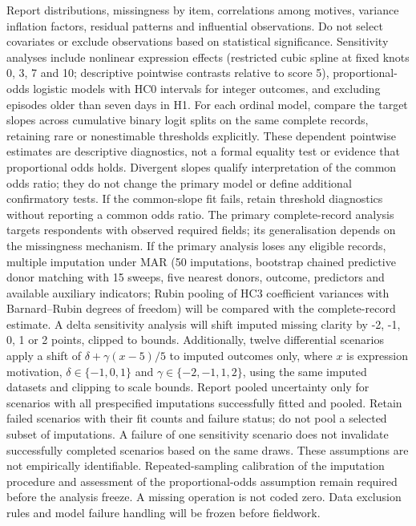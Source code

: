 \documentclass[11pt,a4paper]{article}
\begin{document}
Report distributions, missingness by item, correlations among motives, variance inflation factors, residual patterns and influential observations. Do not select covariates or exclude observations based on statistical significance. Sensitivity analyses include nonlinear expression effects (restricted cubic spline at fixed knots 0, 3, 7 and 10; descriptive pointwise contrasts relative to score 5), proportional-odds logistic models with HC0 intervals for integer outcomes, and excluding episodes older than seven days in H1. For each ordinal model, compare the target slopes across cumulative binary logit splits on the same complete records, retaining rare or nonestimable thresholds explicitly. These dependent pointwise estimates are descriptive diagnostics, not a formal equality test or evidence that proportional odds holds. Divergent slopes qualify interpretation of the common odds ratio; they do not change the primary model or define additional confirmatory tests. If the common-slope fit fails, retain threshold diagnostics without reporting a common odds ratio. The primary complete-record analysis targets respondents with observed required fields; its generalisation depends on the missingness mechanism. If the primary analysis loses any eligible records, multiple imputation under MAR (50 imputations, bootstrap chained predictive donor matching with 15 sweeps, five nearest donors, outcome, predictors and available auxiliary indicators; Rubin pooling of HC3 coefficient variances with Barnard--Rubin degrees of freedom) will be compared with the complete-record estimate. A delta sensitivity analysis will shift imputed missing clarity by -2, -1, 0, 1 or 2 points, clipped to bounds. Additionally, twelve differential scenarios apply a shift of $\delta + \gamma(x-5)/5$ to imputed outcomes only, where $x$ is expression motivation, $\delta\in\{-1,0,1\}$ and $\gamma\in\{-2,-1,1,2\}$, using the same imputed datasets and clipping to scale bounds. Report pooled uncertainty only for scenarios with all prespecified imputations successfully fitted and pooled. Retain failed scenarios with their fit counts and failure status; do not pool a selected subset of imputations. A failure of one sensitivity scenario does not invalidate successfully completed scenarios based on the same draws. These assumptions are not empirically identifiable. Repeated-sampling calibration of the imputation procedure and assessment of the proportional-odds assumption remain required before the analysis freeze. A missing operation is not coded zero. Data exclusion rules and model failure handling will be frozen before fieldwork.
\end{document}
